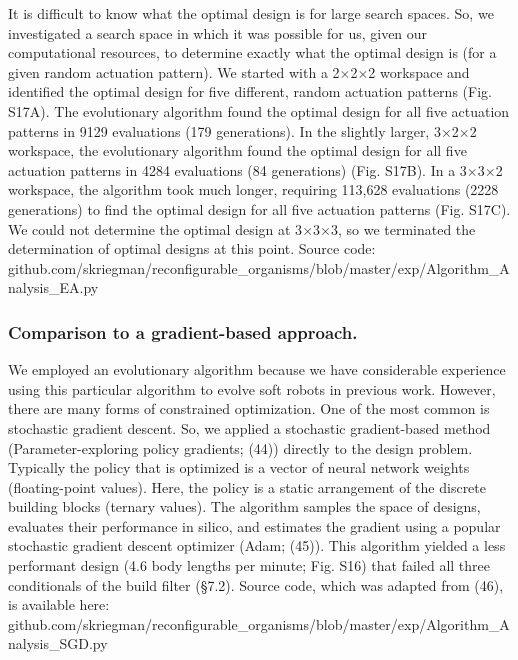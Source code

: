 It is difficult to know what the optimal design is for large search spaces. So, we investigated a search space in which it was possible for us, given our computational resources, to determine exactly what the optimal design is (for a given random actuation pattern). We started with a 2{$\times$}2{$\times$}2 workspace and identified the optimal design for five different, random actuation patterns (Fig. S17A). The evolutionary algorithm found the optimal design for all five actuation patterns in 9129 evaluations (179 generations). In the slightly larger, 3{$\times$}2{$\times$}2 workspace, the evolutionary algorithm found the optimal design for all five actuation patterns in 4284 evaluations (84 generations) (Fig. S17B). In a 3{$\times$}3{$\times$}2 workspace, the algorithm took much longer, requiring 113,628 evaluations (2228 generations) to find the optimal design for all five actuation patterns (Fig. S17C). We could not determine the optimal design at 3{$\times$}3{$\times$}3, so we terminated the determination of optimal designs at this point. Source code: github.com/skriegman/reconfigurable\_organisms/blob/master/exp/Algorithm\_Analysis\_EA.py

\subsubsection*{Comparison to a gradient-based approach.}

We employed an evolutionary algorithm because we have considerable experience using this particular algorithm to evolve soft robots in previous work. However, there are many forms of constrained optimization. One of the most common is stochastic gradient descent. So, we applied a stochastic gradient-based method (Parameter-exploring policy gradients; (44)) directly to the design problem. Typically the policy that is optimized is a vector of neural network weights (floating-point values). Here, the policy is a static arrangement of the discrete building blocks (ternary values). The algorithm samples the space of designs, evaluates their performance in silico, and estimates the gradient using a popular stochastic gradient descent optimizer (Adam; (45)). This algorithm yielded a less performant design (4.6 body lengths per minute; Fig. S16) that failed all three conditionals of the build filter (§7.2). Source code, which was adapted from (46), is available here: github.com/skriegman/reconfigurable\_organisms/blob/master/exp/Algorithm\_Analysis\_SGD.py

